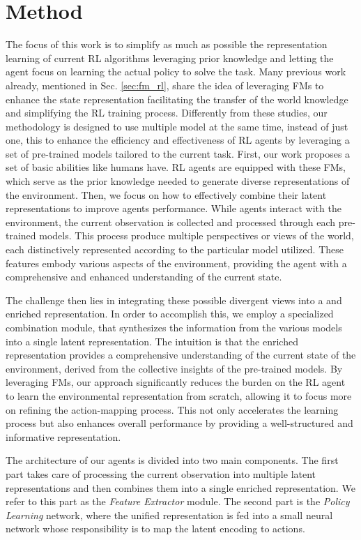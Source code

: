 
\chapter{Method}
\label{sec:method}
The focus of this work is to simplify as much as possible the representation learning of current RL algorithms leveraging prior knowledge and letting the agent focus on learning the actual policy to solve the task.
Many previous work already, mentioned in Sec. \ref{sec:fm_rl}, share the idea of leveraging FMs to enhance the state representation facilitating the transfer of the world knowledge and simplifying the RL training process.
Differently from these studies, our methodology is designed to use multiple model at the same time, instead of just one, this to enhance the efficiency and effectiveness of RL agents by leveraging a set of pre-trained models tailored to the current task.
First, our work proposes a set of basic abilities like humans have.
RL agents are equipped with these FMs, which serve as the prior knowledge needed to generate diverse representations of the environment.
Then, we focus on how to effectively combine their latent representations to improve agents performance.
While agents interact with the environment, the current observation is collected and processed through each pre-trained models.
This process produce multiple perspectives or views of the world, each distinctively represented according to the particular model utilized.
These features embody various aspects of the environment, providing the agent with a comprehensive and enhanced understanding of the current state.

The challenge then lies in integrating these possible divergent views into a   and enriched representation.
In order to  accomplish this, we employ a specialized combination module, that synthesizes the information from the various models into a single latent representation.
The intuition is that the enriched representation provides a comprehensive understanding of the current state of the environment, derived from the collective insights of the pre-trained models.
By leveraging FMs, our approach significantly reduces the burden on the RL agent to learn the environmental representation from scratch, allowing it to focus more on refining the action-mapping process.
This not only accelerates the learning process but also enhances overall performance by providing a well-structured and informative representation.

The architecture of our agents is divided into two main components.
The first part takes care of processing the current observation into multiple latent representations and then combines them into a single enriched representation.
We refer to this part as the \textit{Feature Extractor} module.
The second part is the \textit{Policy Learning} network, where the unified representation is fed into a small neural network whose responsibility is to map the latent encoding to actions.


